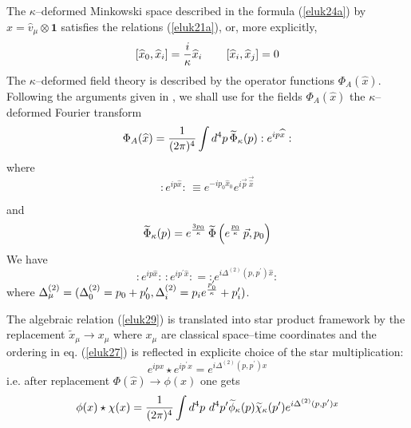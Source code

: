 \documentclass[a4paper,12pt]{article}
\begin{document}
The $\kappa$--deformed Minkowski space described in the formula
 (\ref{eluk24a}) by $\widehat{x}=\widehat{v}_{\mu} \otimes
 \mathbf{1}$ satisfies the relations (\ref{eluk21a}), or, more
 explicitly,
\begin{equation}\label{eluk25}
  \left[ \widehat{x}_{0},
  \widehat{x}_{i}\right] = {i\over \kappa}
  \widehat{x}_{i}
   \qquad
  \left[ \widehat{x}_{i},
  \widehat{x}_{j}\right] = 0
\end{equation}
The $\kappa$--deformed field theory is described by the operator
functions $\Phi_{A}(\widehat{x})$. Following the arguments given
in \cite{rluk17},\cite{rluk14} we shall use for the fields
$\Phi_{A}(\widehat{x})$ the $\kappa$--deformed  Fourier transform
\begin{equation}\label{eluk26}
\Phi_{A}(\widehat{x}) =
{1\over (2\pi)^{4}} \int d^{4} p \,
\widetilde{\Phi}_{\kappa}(p) :
e^{ip\widehat{x}}:
\end{equation}
where
\begin{equation}\label{eluk27}
:e^{ip\widehat{x}}: \, \equiv
e^{- ip_{0}\widehat{x}_{0}}
e^{i\vec{p}\,  \vec{\widehat{x}} }
\end{equation}

and
\begin{equation}\label{eluk28}
\widetilde{\Phi}_{\kappa}(p) =
e^{ {3p_{0} \over \kappa}}\,
\widetilde{\Phi}\left( e^{{p_{0}\over \kappa}} \, \vec{p},p_{0}
\right)
\end{equation}
We have
\begin{equation}\label{eluk29}
:e^{ip\widehat{x}}: \,
:e^{ip^{\prime}\widehat{x}}:
 = :e^{i\Delta^{(2)}(p,p^{\prime})\widehat{x}}:
\end{equation}
where $\Delta^{(2)}_{\mu} = (
\Delta^{(2)}_{0} = p_{0} + p_{0}^{\prime},
\Delta^{(2)}_{i} = p_{i}
e^{{p_{0}^{\prime} \over \kappa}} + p^{\prime}_{i})$.

The algebraic relation (\ref{eluk29}) is translated into star
product framework by the replacement $\widetilde{x}_{\mu} \to
x_{\mu}$ where $x_{\mu}$ are classical  space--time coordinates 
and the ordering in eq.  (\ref{eluk27}) is reflected in explicite
choice of the  star multiplication:
\begin{equation}\label{eluk210}
  e^{ipx} \star e^{ip^{\prime}x} =
e^{i\Delta^{(2)}(p,p^{\prime}){x}}
\end{equation}
i.e. after replacement $\Phi(\widehat{x}) \to \phi(x)$ one gets
\begin{equation}\label{eluk211}
  \phi(x) \star \chi(x) =
  {1\over (2\pi)^{4}} \int d^{4} p \ d^{4}p^{\prime}
  \widetilde{\phi}_{\kappa}(p)
  \widetilde{\chi}_{\kappa}(p^{\prime})
e^{i\Delta^{(2)}(p,p^{\prime}){x}}
\end{equation}
\end{document}
